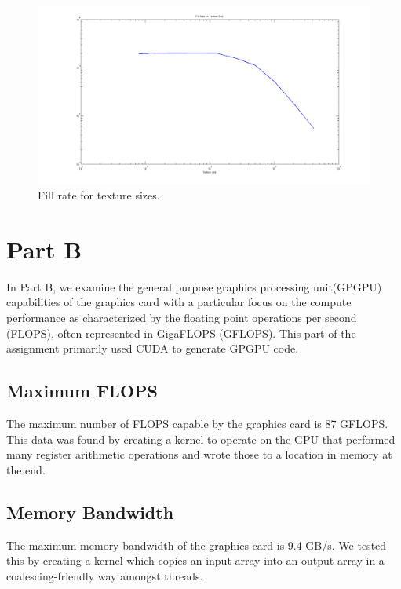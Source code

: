 \documentclass[12pt] {article}
\begin{document}
\begin{figure}[ht!]
	\centering
	\includegraphics[width=5in]{figures/results4-fill-rate-vs-texture.png}
	\caption{Fill rate for texture sizes.}
\end{figure}
\FloatBarrier

\clearpage
\newpage
\section{Part B}
In Part B, we examine the general purpose graphics processing unit(GPGPU) capabilities of the graphics card with a particular focus on the compute performance as characterized by the floating point operations per second (FLOPS), often represented in GigaFLOPS (GFLOPS). This part of the assignment primarily used CUDA to generate GPGPU code.


\subsection{Maximum FLOPS}
The maximum number of FLOPS capable by the graphics card is 87 GFLOPS. This data was found by creating a kernel to operate on the GPU that performed many register arithmetic operations and wrote those to a location in memory at the end.


\subsection{Memory Bandwidth}
The maximum memory bandwidth of the graphics card is 9.4 GB/s. We tested this by creating a kernel which copies an input array into an output array in a coalescing-friendly way amongst threads.

\newpage
\end{document}
